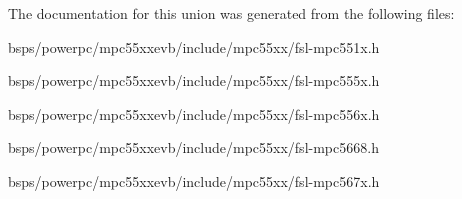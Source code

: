 The documentation for this union was generated from the following files\+:\begin{DoxyCompactItemize}
\item 
bsps/powerpc/mpc55xxevb/include/mpc55xx/fsl-\/mpc551x.\+h\item 
bsps/powerpc/mpc55xxevb/include/mpc55xx/fsl-\/mpc555x.\+h\item 
bsps/powerpc/mpc55xxevb/include/mpc55xx/fsl-\/mpc556x.\+h\item 
bsps/powerpc/mpc55xxevb/include/mpc55xx/fsl-\/mpc5668.\+h\item 
bsps/powerpc/mpc55xxevb/include/mpc55xx/fsl-\/mpc567x.\+h\end{DoxyCompactItemize}
